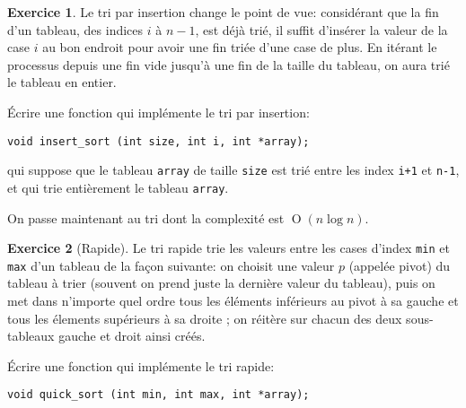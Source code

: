 \documentclass[french,a4paper]{article}
\theoremstyle{definition}
\newtheorem{exercise}{Exercice}
\theoremstyle{remark}
\newcommand{\inlinec}[1]{\lstinline[style=C]°#1°}
\begin{document}
\begin{exercise}
  Le tri par insertion change le point de vue: considérant que la fin
  d'un tableau, des indices $i$ à $n-1$, est déjà trié, il suffit
  d'insérer la valeur de la case $i$ au bon endroit pour avoir une fin
  triée d'une case de plus. En itérant le processus depuis une fin
  vide jusqu'à une fin de la taille du tableau, on aura trié le
  tableau en entier.

  \'Ecrire une fonction qui implémente le tri par insertion:
  \begin{lstlisting}
void insert_sort (int size, int i, int *array);    
  \end{lstlisting}
  qui suppose que le tableau \inlinec{array} de taille \inlinec{size}
  est trié entre les index \inlinec{i+1} et \inlinec{n-1}, et qui trie
  entièrement le tableau \inlinec{array}.
\end{exercise}

On passe maintenant au tri dont la complexité est
$\operatorname{O}(n \log n)$.

\begin{exercise}[Rapide]
  Le tri rapide trie les valeurs entre les cases d'index \inlinec{min}
  et \inlinec{max} d'un tableau de la façon suivante: on choisit une
  valeur $p$ (appelée pivot) du tableau à trier (souvent on prend
  juste la dernière valeur du tableau), puis on met dans n'importe
  quel ordre tous les éléments inférieurs au pivot à sa gauche et tous
  les élements supérieurs à sa droite ; on réitère sur chacun des deux
  sous-tableaux gauche et droit ainsi créés.

  \'Ecrire une fonction qui implémente le tri rapide:
  \begin{lstlisting}
void quick_sort (int min, int max, int *array);
  \end{lstlisting}
\end{exercise}
\end{document}
